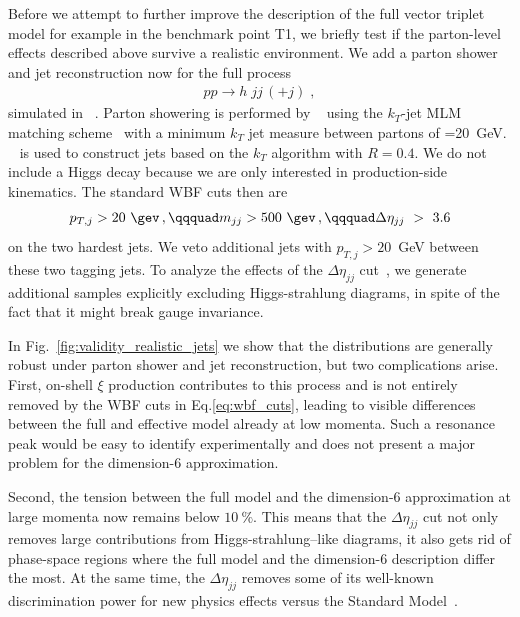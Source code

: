 Before we attempt to further improve the description of the full vector
triplet model for example in the benchmark point T1, we briefly test
if the parton-level effects described above survive a realistic environment.
We add a parton shower and jet reconstruction now for the full
process
%
\begin{align}
  p p \to h \; j j \, (+j) \; ,
\end{align}
%
simulated in ~\cite{madgraph}.  Parton showering is
performed by ~\cite{pythia} using the $k_T$-jet MLM
matching scheme~\cite{mlm} with a minimum $k_T$ jet measure between
partons of =20~GeV. ~\cite{fastjet}
is used to construct jets based on the $k_T$ algorithm with $R = 0.4$. We do not
include a Higgs decay because we are only interested in
production-side kinematics.  The standard WBF cuts then are
%
\begin{align}
  p_{T,j} > 20~\gev \,, \qqquad 
  m_{jj} > 500~\gev \,, \qqquad 
  \Delta \eta_{jj}~>~3.6
\label{eq:wbf_cuts}
\end{align}
%
on the two hardest jets. We veto additional jets with
$p_{T,j} > 20$~GeV between these two tagging jets.  To analyze the
effects of the $\Delta \eta_{jj}$ cut~\cite{spins2}, we generate
additional samples explicitly excluding Higgs-strahlung diagrams, in
spite of the fact that it might break gauge invariance.

In Fig.~\ref{fig:validity_realistic_jets} we show that the distributions are
generally robust under parton shower and jet reconstruction, but two
complications arise.  First, on-shell $\xi$ production contributes to
this process and is not entirely removed by the WBF cuts in
Eq.\;\eqref{eq:wbf_cuts}, leading to visible differences between the
full and effective model already at low momenta. Such a resonance peak
would be easy to identify experimentally and does not present a major
problem for the dimension-6 approximation.

Second, the tension between the full model and the dimension-6
approximation at large momenta now remains below $10~\%$.  This means
that the $\Delta \eta_{jj}$ cut not only removes large contributions
from Higgs-strahlung--like diagrams, it also gets rid of phase-space
regions where the full model and the dimension-6 description differ
the most.  At the same time, the $\Delta \eta_{jj}$ removes some of
its well-known discrimination power for new physics effects versus the
Standard Model~\cite{spins2}.




